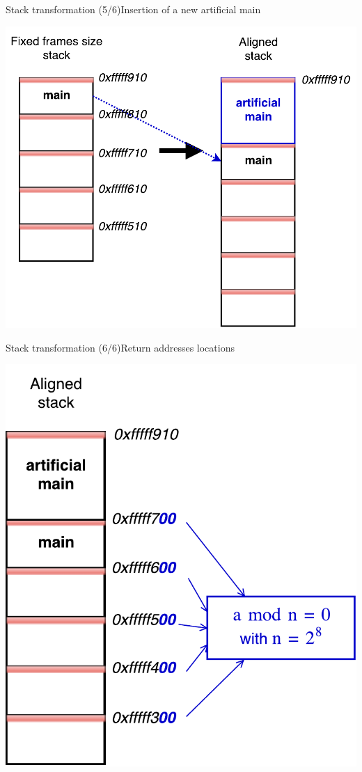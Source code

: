 \documentclass{beamer}
\begin{document}
\begin{frame}[c]{Stack transformation (5/6)}{Insertion of a new artificial main}
	\begin{center}
		\includegraphics[height=0.75\textheight]{images/stack_transfo_4.pdf}
	\end{center}
\end{frame}
\begin{frame}[c]{Stack transformation (6/6)}{Return addresses locations}
	\begin{center}
   		\includegraphics[height=0.75\textheight]{images/stack_transfo_5.pdf}
	\end{center}
\end{frame}
\end{document}
